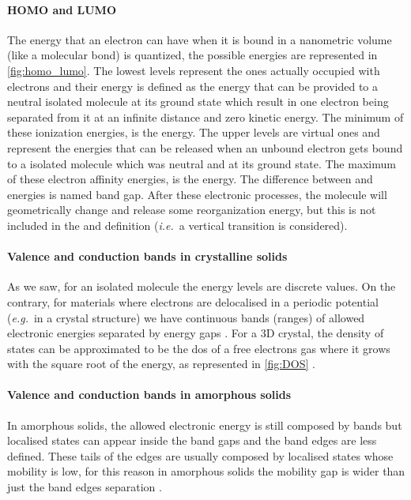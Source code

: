 		\paragraph{HOMO and LUMO}
		The energy that an electron can have when it is bound in a nanometric volume (like a molecular bond) is quantized, the possible energies are represented in \cref{fig:homo_lumo}.
		The lowest levels represent the ones actually occupied with electrons and their energy is defined as the energy that can be provided to a neutral isolated molecule at its ground state which result in one electron being separated from it at an infinite distance and zero kinetic energy.
		The minimum of these ionization energies, is the  energy.
		The upper levels are virtual ones and represent the energies that can be released when an unbound electron gets bound to a isolated molecule which was neutral and at its ground state.
		The maximum of these electron affinity energies, is the  energy.
		The difference between  and  energies is named band gap.
		After these electronic processes, the molecule will geometrically change and release some reorganization energy, but this is not included in the  and  definition (\textsl{i.e.}\ a vertical transition is considered).

		\paragraph{Valence and conduction bands in crystalline solids}
		As we saw, for an isolated molecule the energy levels are discrete values.
		On the contrary, for materials where electrons are delocalised in a periodic potential (\textsl{e.g.}\ in a crystal structure) we have continuous bands (ranges) of allowed electronic energies separated by energy gaps \cite{WikipediaPeriodic}.
		For a 3D crystal, the density of states can be approximated to be the \gls{dos} of a free electrons gas where it grows with the square root of the energy, as represented in \cref{fig:DOS} \cite[140]{Kittel2004}.
		
		\paragraph{Valence and conduction bands in amorphous solids}
		In amorphous solids, the allowed electronic energy is still composed by bands but localised states can appear inside the band gaps and the band edges are less defined.
		These tails of the edges are usually composed by localised states whose mobility is low, for this reason in amorphous solids the mobility gap is wider than just the band edges separation \cite[213]{Stenzel2005}.
		
